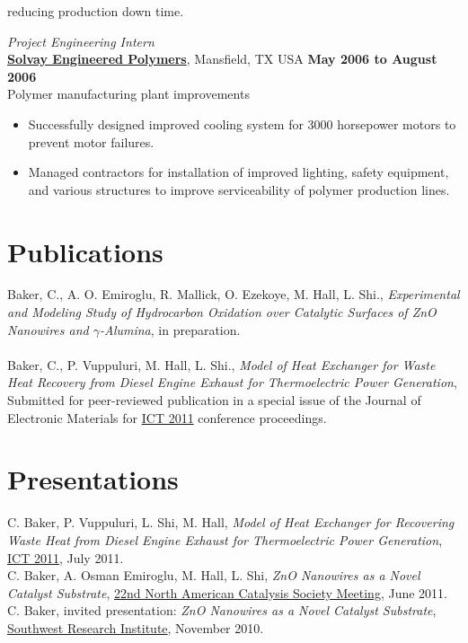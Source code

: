 \documentclass[centered]{res}
\begin{document}
\begin{resume}
\begin{itemize}
  reducing production down time.
\end{itemize} \vspace{-8pt}
%
\textit{Project Engineering Intern} \\
\href{http://www.lyondellbasell.com/LandingPages/SolvayEngineeredPolymers}{\textbf{Solvay
    Engineered Polymers}}, Mansfield, TX USA 
\hfill \textbf{May 2006 to August 2006} \\
Polymer manufacturing plant improvements 
\begin{itemize} \itemsep -2pt %
\item Successfully designed improved cooling system for 3000
  horsepower motors to prevent motor failures.
\item Managed contractors for installation of improved lighting,
  safety equipment, and various structures to improve serviceability
  of polymer production lines.
\end{itemize} 
%
\section{Publications}

Baker, C., A. O. Emiroglu, R. Mallick, O. Ezekoye, M. Hall, L. Shi.,
\textit{Experimental and Modeling Study of Hydrocarbon Oxidation over
  Catalytic Surfaces of ZnO Nanowires and $\gamma$-Alumina}, in
preparation. \\
\vspace{-5pt} \\
%
Baker, C., P. Vuppuluri, M. Hall, L. Shi., \textit{Model of Heat
  Exchanger for Waste Heat Recovery from Diesel Engine Exhaust for
  Thermoelectric Power Generation}, Submitted for peer-reviewed
publication in a special issue of the Journal of Electronic Materials
for \href{http://ict2011.its.org/}{ICT 2011} conference proceedings.

\section{Presentations}

C. Baker, P. Vuppuluri, L. Shi, M. Hall, \textit{Model of Heat
  Exchanger for Recovering Waste Heat from Diesel Engine Exhaust for
  Thermoelectric Power Generation},
\href{http://ict2011.its.org/}{ICT 2011}, July 2011. 
\vspace{5pt} \\
C. Baker, A. Osman Emiroglu, M. Hall, L. Shi, \textit{ZnO
  Nanowires as a Novel Catalyst Substrate},
\href{http://www.22nam.org/}{22nd North
  American Catalysis Society Meeting}, June 2011. 
\vspace{5pt} \\
C. Baker, invited presentation: \textit{ZnO Nanowires as
  a Novel Catalyst Substrate},
\href{http://www.swri.org/4org/d03/d03home.htm}%
{Southwest Research Institute}, November 2010.


\end{resume}
\end{document}

